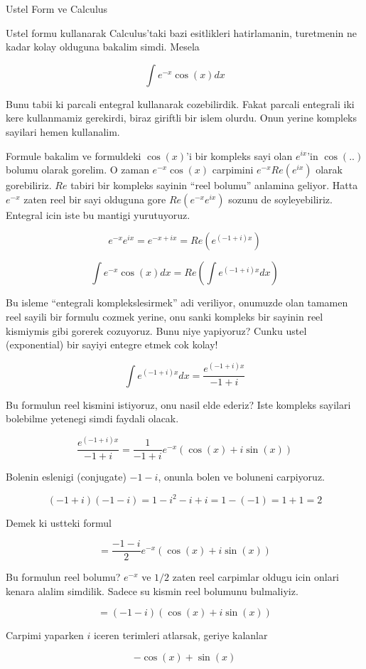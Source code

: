 \documentclass[12pt,fleqn]{article}\usepackage{../common}
\begin{document}
Ustel Form ve Calculus

Ustel formu kullanarak Calculus'taki bazi esitlikleri hatirlamanin,
turetmenin ne kadar kolay olduguna bakalim simdi. Mesela

\[ \int e^{-x}\cos(x) dx \]

Bunu tabii ki parcali entegral kullanarak cozebilirdik. Fakat parcali
entegrali iki kere kullanmamiz gerekirdi, biraz giriftli bir islem
olurdu. Onun yerine kompleks sayilari hemen kullanalim. 

Formule bakalim ve formuldeki $\cos(x)$'i bir kompleks sayi olan $e^{ix}$'in
$\cos(..)$ bolumu olarak gorelim. O zaman $e^{-x}\cos(x)$ carpimini
$e^{-x}Re(e^{ix}) $ olarak gorebiliriz. $Re$ tabiri bir kompleks sayinin
``reel bolumu'' anlamina geliyor. Hatta $e^{-x}$ zaten reel bir sayi
olduguna gore $Re(e^{-x}e^{ix})$ sozunu de soyleyebiliriz. Entegral icin
iste bu mantigi yurutuyoruz.

\[ e^{-x}e^{ix} = e^{-x + ix} = Re(e^{(-1+i)x}) \]

\[ \int e^{-x}\cos(x) dx = Re (\int e^{(-1+i)x} dx) \]

Bu isleme ``entegrali komplekslesirmek'' adi veriliyor, onumuzde olan
tamamen reel sayili bir formulu cozmek yerine, onu sanki kompleks bir
sayinin reel kismiymis gibi gorerek cozuyoruz. Bunu niye yapiyoruz? Cunku
ustel (exponential) bir sayiyi entegre etmek cok kolay!

\[ \int e^{(-1+i)x} dx = \frac{e^{(-1+i)x}}{-1+i}\]

Bu formulun reel kismini istiyoruz, onu nasil elde ederiz? Iste kompleks
sayilari bolebilme yetenegi simdi faydali olacak.

\[  \frac{e^{(-1+i)x}}{-1+i} = \frac{1}{-1+i} e^{-x}(\cos(x) + i\sin(x))\]

Bolenin eslenigi (conjugate) $-1-i$, onunla bolen ve boluneni
carpiyoruz.

\[ (-1+i)(-1-i) = 1-i^2-i+i = 1-(-1) = 1+1 = 2\]

Demek ki ustteki formul

\[ = \frac{-1-i}{2} e^{-x}(\cos(x) + i\sin(x)) \]

Bu formulun reel bolumu? $e^{-x}$ ve $1/2$ zaten reel carpimlar oldugu icin
onlari kenara alalim simdilik. Sadece su kismin reel bolumunu bulmaliyiz.

\[ = (-1-i)(\cos(x) + i\sin(x)) \]

Carpimi yaparken $i$ iceren terimleri atlarsak, geriye kalanlar

\[ -\cos(x) + \sin(x) \]
\end{document}
